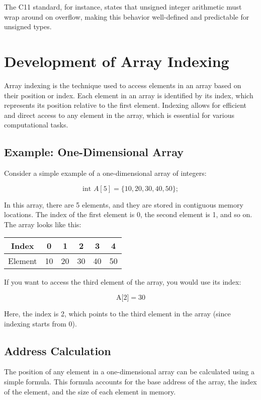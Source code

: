 \documentclass{book}
\begin{document}
The C11 standard, for instance, states that unsigned integer arithmetic must wrap around on overflow, making this behavior well-defined and predictable for unsigned types.


\section{Development of Array Indexing}
	
	Array indexing is the technique used to access elements in an array based on their position or index. Each element in an array is identified by its index, which represents its position relative to the first element. Indexing allows for efficient and direct access to any element in the array, which is essential for various computational tasks.
	
	\subsection{Example: One-Dimensional Array}
	
	Consider a simple example of a one-dimensional array of integers:
	
	\[\text{int } A[5] = \{10, 20, 30, 40, 50\};\]
	
	In this array, there are 5 elements, and they are stored in contiguous memory locations. The index of the first element is 0, the second element is 1, and so on. The array looks like this:
	
	\begin{center}
    		\begin{tabular}{|c|c|c|c|c|c|}
			\hline
				Index & 0 & 1 & 2 & 3 & 4 \\
			\hline
			Element & 10 & 20 & 30 & 40 & 50 \\
			\hline
			\end{tabular}
	\end{center}
	
	If you want to access the third element of the array, you would use its index:
	
	\[\text{A[2]} = 30\]
	
	Here, the index is 2, which points to the third element in the array (since indexing starts from 0). 
		
\subsection{Address Calculation}

The position of any element in a one-dimensional array can be calculated using a simple formula. This formula accounts for the base address of the array, the index of the element, and the size of each element in memory.
\end{document}
